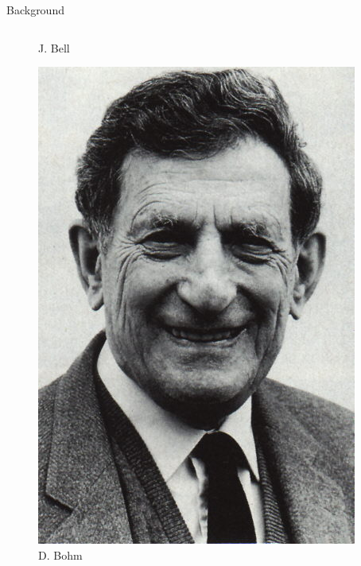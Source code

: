 \documentclass[final,hyperref={pdfpagelabels=false}]{beamer}
\begin{document}
\begin{frame}[t]
\begin{columns}[c]
\begin{column}{.32\textwidth}
\begin{block}{Background}
\begin{columns}
\begin{column}{0.3\textwidth}
\begin{figure}
              \caption{J. Bell}
            \end{figure}
            \begin{figure}
              \includegraphics[width=0.8\linewidth]{bohm}
              \caption{D. Bohm}
            \end{figure}
            \begin{figure}

\end{figure}
\end{column}
\end{columns}
\end{block}
\end{column}
\end{columns}
\end{frame}
\end{document}
